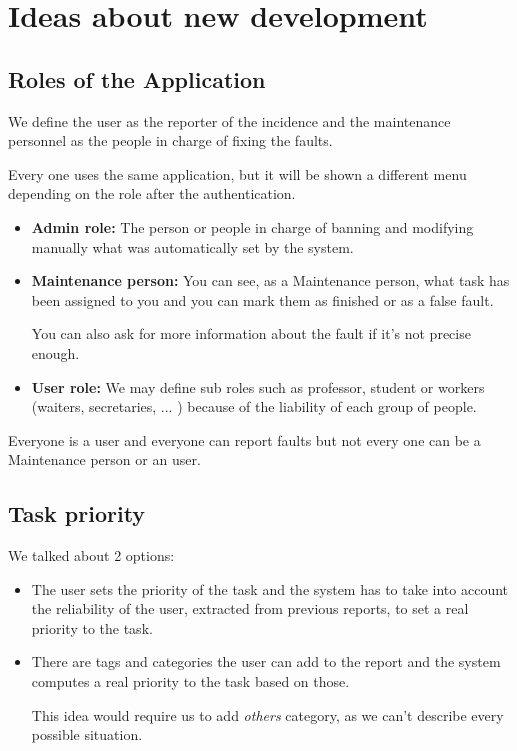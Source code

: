 \section{Ideas about new development}

\subsection{Roles of the Application}

We define the user as the reporter of the incidence and the maintenance personnel as the people in charge of fixing the faults.

Every one uses the same application, but it will be shown a different menu depending on the role after the authentication.

\begin{itemize}
\item \textbf{Admin role: } The person or people in charge of banning and modifying manually what was automatically set by the system.

\item\textbf{Maintenance person:} You can see, as a Maintenance person, what task has been assigned to you and you can mark them as finished or as a false fault.

You can also ask for more information about the fault if it's not precise enough.

\item \textbf{User role: }  We may define sub roles such as professor, student or workers (waiters, secretaries, ... ) because of the liability of each group of people.

\end{itemize}

Everyone is a user and everyone can report faults but not every one can be a Maintenance person or an user.

\subsection{Task priority}
We talked about 2 options:

\begin{itemize}
\item The user sets the priority of the task and the system has to take into account the reliability of the user, extracted from previous reports, to set a real priority to the task.

\item There are tags and categories the user can add to the report and the system computes a real priority to the task based on those.

This idea would require us to add \textit{others} category, as we can't describe every possible situation.
\end{itemize}

